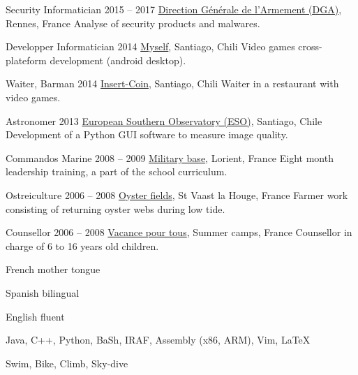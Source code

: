 \begin{joblist}

\item[Security Informatician]{2015 -- 2017}
	{
	\href{http://www.defense.gouv.fr/dga/}{Direction Générale de l'Armement (DGA)}, Rennes, France
	}
	{Analyse of security products and malwares.}


\item[Developper Informatician]{2014}
	{
	\href{https://play.google.com/store/apps/developer?id=tinmarino&hl=en}{Myself}, Santiago, Chili
	}
	{Video games cross-plateform development (android desktop).}


\item[Waiter, Barman]{2014}
	{
	\href{http://www.insertcoin.cl/}{Insert-Coin}, Santiago, Chili
	}
	{Waiter in a restaurant with video games.}


\item[Astronomer]{2013}
	{
	\href{http://www.eso.org/public/}{European Southern Observatory (ESO)}, Santiago, Chile
	}
	{Development of a Python GUI software to measure image quality.}

\item[Commandos Marine]{2008 -- 2009}
	{
	\href{http://www.defense.gouv.fr/marine/organisation/forces/fusiliers-marins-et-commandos/force-maritime-des-fusiliers-marins-et-commandos}{Military base}, Lorient, France
	}
	{Eight ­month leadership training, a part of the school curriculum.}


\item[Ostreiculture]{2006 -- 2008}
	{
	\href{http://huitresdesaintvaast.fr/}{Oyster fields}, St Vaast la Houge, France
	}
	{Farmer work consisting of returning oyster webs during low tide.}


\item[Counsellor]{2006 -- 2008}
	{
	\href{http://www.vacances-pour-tous.org/}{Vacance pour tous}, Summer camps, France
	}
	{Counsellor in charge of 6 to 16 years old children.}
	
	
\end{joblist}


\begin{skilllist}

\begin{languagelist}
\item{French} 	{mother tongue}
\item{Spanish} 	{bilingual}
\item{English} 	{fluent} 
\end{languagelist}


		Java,
		C++, 
		Python, 
		BaSh, 
		IRAF, 
		Assembly (x86, ARM), 
		Vim, 
		\LaTeX
	

	Swim, Bike, Climb, Sky-dive


\end{skilllist}
